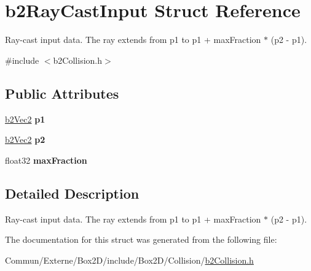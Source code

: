 \hypertarget{structb2_ray_cast_input}{}\section{b2\+Ray\+Cast\+Input Struct Reference}
\label{structb2_ray_cast_input}


Ray-\/cast input data. The ray extends from p1 to p1 + max\+Fraction $\ast$ (p2 -\/ p1).  




{\ttfamily \#include $<$b2\+Collision.\+h$>$}

\subsection*{Public Attributes}
\begin{DoxyCompactItemize}
\item 
\hyperlink{structb2_vec2}{b2\+Vec2} {\bfseries p1}\hypertarget{structb2_ray_cast_input_a7254a7062422833b1124fa464ab4caf3}{}\label{structb2_ray_cast_input_a7254a7062422833b1124fa464ab4caf3}

\item 
\hyperlink{structb2_vec2}{b2\+Vec2} {\bfseries p2}\hypertarget{structb2_ray_cast_input_a850102c843469781a3a627c871043d0b}{}\label{structb2_ray_cast_input_a850102c843469781a3a627c871043d0b}

\item 
float32 {\bfseries max\+Fraction}\hypertarget{structb2_ray_cast_input_acb5c88e0ef2c3716a1334611522ab0b2}{}\label{structb2_ray_cast_input_acb5c88e0ef2c3716a1334611522ab0b2}

\end{DoxyCompactItemize}


\subsection{Detailed Description}
Ray-\/cast input data. The ray extends from p1 to p1 + max\+Fraction $\ast$ (p2 -\/ p1). 

The documentation for this struct was generated from the following file\+:\begin{DoxyCompactItemize}
\item 
Commun/\+Externe/\+Box2\+D/include/\+Box2\+D/\+Collision/\hyperlink{b2_collision_8h}{b2\+Collision.\+h}\end{DoxyCompactItemize}
